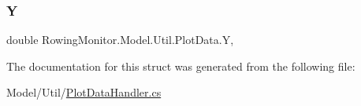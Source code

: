 \subsubsection{\texorpdfstring{Y}{Y}}
{\footnotesize\ttfamily double Rowing\+Monitor.\+Model.\+Util.\+Plot\+Data.\+Y\hspace{0.3cm}{\ttfamily [get]}, {\ttfamily [set]}}



The documentation for this struct was generated from the following file\+:\begin{DoxyCompactItemize}
\item 
Model/\+Util/\hyperlink{_plot_data_handler_8cs}{Plot\+Data\+Handler.\+cs}\end{DoxyCompactItemize}
